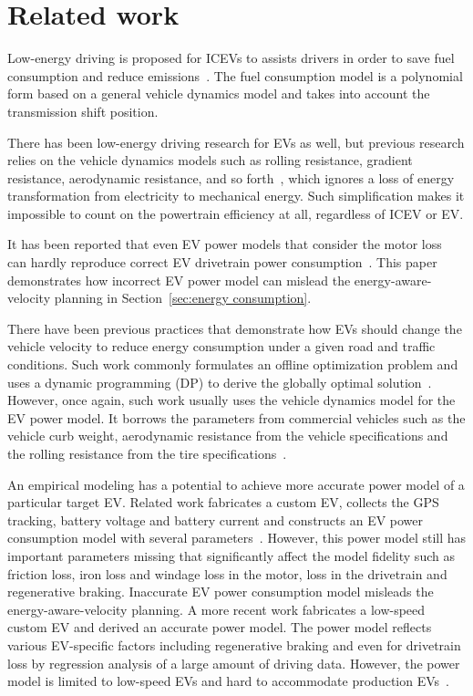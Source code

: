 \documentclass{IEEEtran}
\begin{document}
\section{Related work} \label{sec:related work}
  
Low-energy driving is proposed for ICEVs to assists drivers in order to save fuel consumption and reduce emissions~\cite{Seraens:thesis12, Kamal:TITS11, Ozatay:TITS14, Dovgana:ASC14, Ozatay:IFAC14, Khayyam:ESA12}.  
The fuel consumption model is a polynomial form based on a general vehicle dynamics model and takes into account the transmission shift position. 

There has been low-energy driving research for EVs as well, but previous research relies on the vehicle dynamics models such as rolling resistance, gradient resistance, aerodynamic resistance, and so forth~\cite{Yan:NAPS14}, which ignores a loss of energy transformation from electricity to mechanical energy. Such simplification makes it impossible to count on the powertrain efficiency at all, regardless of ICEV or EV. 

It has been reported that even EV power models that consider the motor loss~\cite{Lin:ICCA14, Wu:ITS15, Dib:IVPPC11} can hardly reproduce correct EV drivetrain power consumption~\cite{Hong:ASPDAC16}. This paper  demonstrates how incorrect EV power model can mislead the energy-aware-velocity planning in Section~\ref{sec:energy consumption}. 

There have been previous practices that demonstrate how EVs should change the vehicle velocity to reduce energy consumption under  a given road and traffic conditions. Such work commonly formulates an offline optimization problem and uses a dynamic programming (DP) to derive the globally optimal solution~\cite{Lin:ICCA14, Dib:IVPPC11, Dib:OGST12, Mensing:TR13}. However, once again, such work usually uses the vehicle dynamics model for the EV power model. It borrows the parameters from commercial vehicles such as the vehicle curb weight, aerodynamic resistance from the vehicle specifications and the rolling resistance from the tire specifications~\cite{Lin:ICCA14}. 

An empirical modeling has a potential to achieve more accurate power model  of a particular target EV. Related work fabricates a custom EV, collects the GPS tracking, battery voltage and battery current and constructs an EV power consumption model with several parameters~\cite{Dib:IVPPC11}. However, this power model still has important parameters missing that significantly affect the model fidelity such as friction loss, iron loss and windage loss in the motor, loss in the drivetrain and regenerative braking. Inaccurate EV power consumption model misleads the energy-aware-velocity planning. A more recent work fabricates a low-speed custom EV and derived an accurate power model. The power model reflects various EV-specific factors including regenerative braking and even for drivetrain loss by regression analysis of a large amount of driving data. However, the power model is limited to low-speed EVs and hard to accommodate production EVs~\cite{Hong:ASPDAC16}. 
\end{document}
